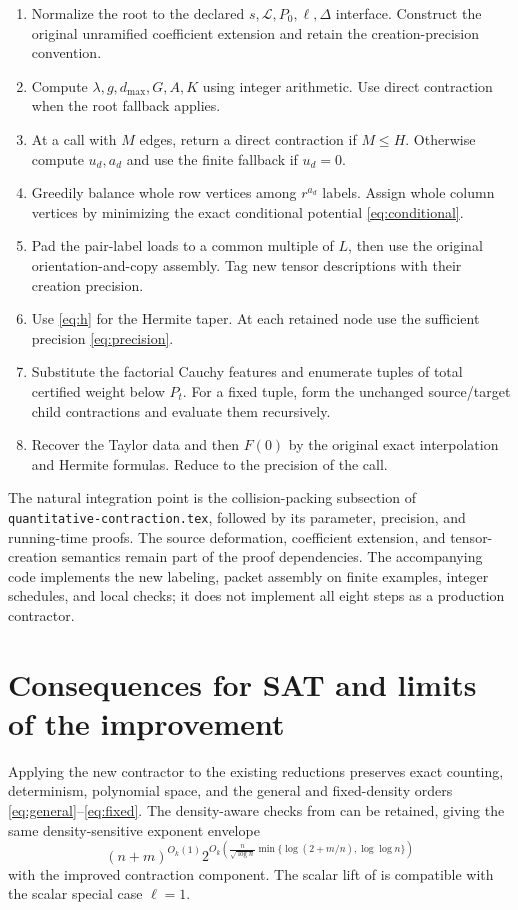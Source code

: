 \documentclass[11pt,letterpaper]{article}
\numberwithin{equation}{section}
\theoremstyle{definition}\newtheorem{definition}[theorem]{Definition}
\theoremstyle{remark}\newtheorem{remark}[theorem]{Remark}
\newcommand{\desc}{\mathcal L}
\begin{document}
\begin{enumerate}
\item Normalize the root to the declared $s,\desc,P_0,\ell,\Delta$ interface.
Construct the original unramified coefficient extension and retain the
creation-precision convention.
\item Compute $\lambda,g,d_{\max},G,A,K$ using integer arithmetic.
Use direct contraction when the root fallback applies.
\item At a call with $M$ edges, return a direct contraction if $M\le H$.
Otherwise compute $u_d,a_d$ and use the finite fallback if $u_d=0$.
\item Greedily balance whole row vertices among $r^{a_d}$ labels.
Assign whole column vertices by minimizing the exact conditional potential
\eqref{eq:conditional}.
\item Pad the pair-label loads to a common multiple of $L$, then use the
original orientation-and-copy assembly. Tag new tensor descriptions with
their creation precision.
\item Use \eqref{eq:h} for the Hermite taper. At each retained node use the
sufficient precision \eqref{eq:precision}.
\item Substitute the factorial Cauchy features and enumerate tuples of
total certified weight below $P_t$. For a fixed tuple, form the unchanged
source/target child contractions and evaluate them recursively.
\item Recover the Taylor data and then $F(0)$ by the original exact
interpolation and Hermite formulas. Reduce to the precision of the call.
\end{enumerate}

The natural integration point is the collision-packing subsection of
\texttt{quantitative-contraction.tex}, followed by its parameter,
precision, and running-time proofs. The source deformation, coefficient
extension, and tensor-creation semantics remain part of the proof
dependencies. The accompanying code implements the new labeling, packet
assembly on finite examples, integer schedules, and local checks; it does
not implement all eight steps as a production contractor.

\section{Consequences for SAT and limits of the improvement}
\label{sec:sat}

Applying the new contractor to the existing reductions preserves exact
counting, determinism, polynomial space, and the general and fixed-density
orders \eqref{eq:general}--\eqref{eq:fixed}. The density-aware checks from
\cite{densitypacket,densitypacket2} can be retained, giving the same
density-sensitive exponent envelope
\[
 (n+m)^{O_k(1)}
 2^{O_k\left(
 \frac{n}{\sqrt{\log n}}
 \min\{\log(2+m/n),\log\log n\}\right)}
\]
with the improved contraction component. The scalar lift of
\cite{scalarpacket} is compatible with the scalar special case $\ell=1$.
\end{document}
